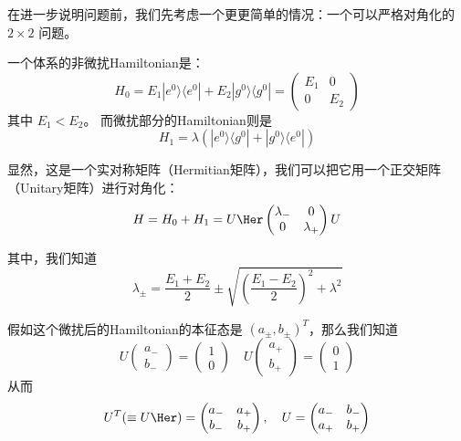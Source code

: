 在进一步说明问题前，我们先考虑一个更更简单的情况：一个可以严格对角化的 $2\times2$ 问题。

\begin{exercise}{}
一个体系的非微扰Hamiltonian是：
\begin{equation}
H_0 = E_1|e^0\rangle\langle e^0| + E_2|g^0\rangle\langle g^0| =  \left(\begin{matrix} E_1 & 0\\ 0 & E_2\end{matrix}\right)
\end{equation}
其中 $E_1<E_2$。 而微扰部分的Hamiltonian则是
\begin{equation}
H_1 = \lambda(|e^0\rangle\langle g^0|+|g^0\rangle\langle e^0|)
\end{equation}

显然，这是一个实对称矩阵（Hermitian矩阵），我们可以把它用一个正交矩阵（Unitary矩阵）进行对角化：
\begin{equation}
H = H_0+H_1 = U\Her\left(\begin{matrix} \lambda_- & 0\\0 & \lambda_+\end{matrix}\right)U
\end{equation}

其中，我们知道
\begin{equation}
\lambda_{\pm} = \frac{E_1+E_2}{2} \pm \sqrt{\left( \frac{E_1-E_2}{2}\right)^2 + \lambda^2}
\end{equation}

假如这个微扰后的Hamiltonian的本征态是 $(a_\pm,b_\pm)^T$，那么我们知道
\begin{equation}
U\left(\begin{matrix}a_-\\b_-\end{matrix}\right) = \left(\begin{matrix}1\\0\end{matrix}\right)\quad U\left(\begin{matrix}a_+\\b_+\end{matrix}\right) = \left(\begin{matrix}0\\1\end{matrix}\right)
\end{equation}
从而
\begin{equation}
U^T(\equiv U\Her) = \left(\begin{matrix}a_- & a_+\\b_- & b_+\end{matrix}\right), \quad U = \left(\begin{matrix}a_- & b_-\\a_+ & b_+\end{matrix}\right)
\end{equation}


\end{exercise}
